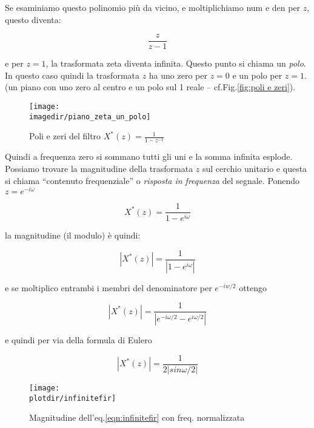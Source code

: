   Se esaminiamo questo polinomio pi\`u da vicino, e moltiplichiamo num e den
   per $z$, questo diventa:

		 \begin{equation}
						 \frac{z}{z - 1}
		 \end{equation}

   e per $z = 1$, la trasformata zeta diventa infinita. Questo punto si chiama
	 un \emph{polo}. In questo caso quindi la trasformata $z$ ha uno zero per $z = 0$ e
	 un polo per $z = 1$. (un piano con uno zero al centro e un polo sul 1 reale -- cf.Fig.\vref{fig:poli e zeri}).
	 \begin{figure}[Hbtp]
			\begin{center}
				\texttt{[image: \\imagedir/piano\_zeta\_un\_polo]}
				\caption{Poli e zeri del filtro $X^{*}(z) = \frac{1}{1-z^{-1}}$\label{fig:poli e zeri}}
			\end{center}
	 \end{figure}
   Quindi a frequenza zero si sommano tutti gli uni e la somma infinita
   esplode. Possiamo trovare la magnitudine della trasformata $z$ sul cerchio
   unitario e questa si chiama ``contenuto frequenziale'' o \emph{risposta in
	 frequenza} del segnale. Ponendo $z = e^{-i\omega}$

		 \begin{equation}
				X^{*}(z) = \frac{1}{1 - e^{i\omega}}
		 \end{equation}

   la magnitudine (il modulo) \`e quindi:

		 \begin{equation}
				|X^{*}(z)| = \frac{1}{|1 - e^{i\omega}|}
		 \end{equation}


   e se moltiplico entrambi i membri del denominatore per $e^{-iw/2}$ ottengo

		 \begin{equation}
				 |X^{*}(z)| = \frac{1}{|e^{-i\omega/2} - e^{i\omega/2}|}
		 \end{equation}

   e quindi per via della formula di Eulero                 

	   \begin{equation}\label{eqn:infinitefir}
				 |X^{*}(z)| = \frac{1}{2 |sin {\omega/2}|}
		 \end{equation}
	\begin{figure}[htbp]	
		\begin{center}
			\texttt{[image: \\plotdir/infinitefir]}
			\caption{Magnitudine dell'eq.\ref{eqn:infinitefir} con freq.  normalizzata}
		\end{center}
	\end{figure}
